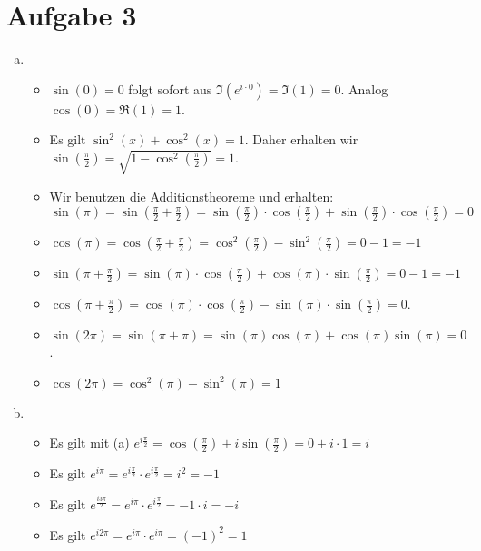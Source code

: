 \documentclass{article}
\begin{document}
    \section*{Aufgabe 3}
    \begin{enumerate}[(a)]
        \item \begin{itemize}
            \item $\sin(0) = 0$ folgt sofort aus $\Im(e^{i\cdot 0}) = \Im(1) = 0$. Analog $\cos(0) = \Re(1) = 1$.
            \item Es gilt $\sin^2(x) + \cos^2(x) = 1$. Daher erhalten wir $\sin(\frac{\pi}{2}) = \sqrt{1 - \cos^2(\frac{\pi }{2})} = 1$.
            \item Wir benutzen die Additionstheoreme und erhalten: 
            $\sin(\pi) = \sin\left(\frac{\pi}{2} + \frac{\pi }{2}\right) = \sin\left(\frac{\pi }{2}\right)\cdot \cos\left(\frac{\pi }{2}\right) + \sin\left(\frac{\pi }{2}\right) \cdot \cos\left(\frac{\pi }{2}\right) = 0$
            \item $\cos(\pi) = \cos\left(\frac{\pi}{2} + \frac{\pi }{2}\right) = \cos^2\left(\frac{\pi }{2}\right) - \sin^2\left(\frac{\pi }{2}\right) = 0 -1 = -1$
            \item $\sin\left(\pi + \frac{\pi}{2}\right) = \sin(\pi)\cdot \cos\left(\frac{\pi}{2}\right) + \cos(\pi) \cdot \sin\left(\frac{\pi}{2}\right) = 0 - 1 = -1$
            \item $\cos\left(\pi + \frac{\pi}{2}\right) = \cos(\pi) \cdot \cos\left(\frac{\pi}{2}\right) - \sin(\pi)\cdot \sin\left(\frac{\pi}{2}\right) = 0$.
            \item $\sin(2\pi) = \sin(\pi + \pi) = \sin(\pi) \cos(\pi) + \cos(\pi)\sin(\pi) = 0$.
            \item $\cos(2\pi) = \cos^2(\pi) - \sin^2(\pi) = 1$
        \end{itemize}
        \item \begin{itemize} 
    		\item Es gilt mit (a) $e^{i\frac{\pi}{2}}= \cos(\frac{\pi}{2})+i\sin(\frac{\pi}{2})= 0 + i\cdot 1 = i $
    		\item Es gilt $e^{i\pi}= e^{i\frac{\pi}{2}} \cdot e^{i\frac{\pi}{2}} = i^2 = -1$
    		\item Es gilt $e^{\frac{i3\pi}{2}} = e^{i\pi} \cdot e^{i\frac{\pi}{2}} = -1 \cdot i = -i$
    		\item Es gilt $ e^{i2\pi} = e^{i\pi} \cdot e^{i\pi} = (-1)^2 = 1$
    	\end{itemize}
    \end{enumerate}
\end{document}
